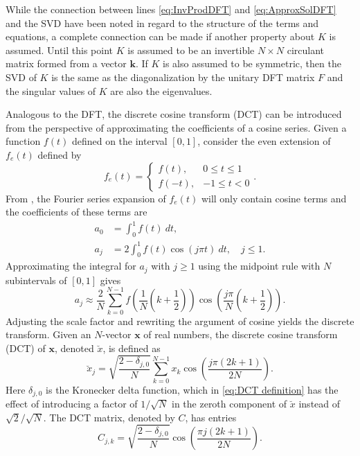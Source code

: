 \documentclass[12pt,notitlepage]{report}
\newcommand{\kVec}{\mathbf{k}}	%
\newcommand{\kMat}{K}	%
\newcommand{\dct}[1]{\breve{#1}}	%
\begin{document}
While the connection between lines \eqref{eq:InvProdDFT} and \eqref{eq:ApproxSolDFT} and the SVD have been noted in regard to the structure of the terms and equations, a complete connection can be made if another property about $\kMat$ is assumed. Until this point $\kMat$ is assumed to be an invertible $N \times N$ circulant matrix formed from a vector $\kVec$. If $\kMat$ is also assumed to be symmetric, then the SVD of $\kMat$ is the same as the diagonalization by the unitary DFT matrix $F$ and the singular values of $\kMat$ are also the eigenvalues. \par 
Analogous to the DFT, the discrete cosine transform (DCT) can be introduced from the perspective of approximating the coefficients of a cosine series. Given a function $f(t)$ defined on the interval $[0,1]$, consider the even extension of $f_e(t)$ defined by
\[f_e(t) = \begin{cases}
f(t), & 0 \leq t \leq 1 \\
f(-t), & -1 \leq t < 0
\end{cases}.\]
From \cite[p.~49]{BoggessNarcowich2009}, the Fourier series expansion of $f_e(t)$ will only contain cosine terms and the coefficients of these terms are
\begin{align*}
a_0 &= \int_0^1 f(t)~dt, \\
a_j &= 2\int_0^1 f(t) \cos(j\pi{t})~dt, \quad j \leq 1.
\end{align*}
Approximating the integral for $a_j$ with $j \geq 1$ using the midpoint rule with $N$ subintervals of $[0,1]$ gives
\[a_j \approx \frac{2}{N}\sum_{k=0}^{N-1} f\left(\frac{1}{N}\left(k+\frac{1}{2}\right)\right)\cos\left(\frac{j\pi}{N}\left(k+\frac{1}{2}\right)\right).\]
Adjusting the scale factor and rewriting the argument of cosine yields the discrete transform. Given an $N$-vector $\mathbf{x}$ of real numbers, the discrete cosine transform (DCT) of $\mathbf{x}$, denoted $\dct{x}$, is defined as
\begin{equation}
\label{eq:DCT definition}
\dct{x}_j = \sqrt{\frac{2 - \delta_{j,0}}{N}} \sum_{k=0}^{N-1} x_k\cos\left(\frac{j\pi(2k + 1)}{2N}\right).
\end{equation}
Here $\delta_{j,0}$ is the Kronecker delta function, which in \eqref{eq:DCT definition} has the effect of introducing a factor of $1/\sqrt{N}$ in the zeroth component of $\dct{x}$ instead of $\sqrt{2}/\sqrt{N}$. The DCT matrix, denoted by $C$, has entries
\begin{equation}
\label{eq:DCT matrix}
C_{j,k} = \sqrt{\frac{2 - \delta_{j,0}}{N}} \cos\left(\frac{\pi{j}(2k + 1)}{2N}\right).
\end{equation}
\end{document}
